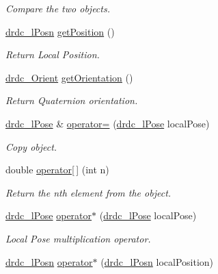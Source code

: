 \begin{CompactItemize}
\begin{CompactList}\small\item\em Compare the two objects. \item\end{CompactList}\item 
\hyperlink{classdrdc__lPosn}{drdc\_\-lPosn} \hyperlink{classdrdc__lPose_9ca79a1aa842f3187d25d783ada66f2a}{getPosition} ()
\begin{CompactList}\small\item\em Return Local Position. \item\end{CompactList}\item 
\hyperlink{classdrdc__Orient}{drdc\_\-Orient} \hyperlink{classdrdc__lPose_0f3c4aacd51b0f1f41de86bd90baaa7d}{getOrientation} ()
\begin{CompactList}\small\item\em Return Quaternion orientation. \item\end{CompactList}\item 
\hyperlink{classdrdc__lPose}{drdc\_\-lPose} \& \hyperlink{classdrdc__lPose_61ef881f54c7b30e4a2bc2dda04c81cc}{operator=} (\hyperlink{classdrdc__lPose}{drdc\_\-lPose} localPose)
\begin{CompactList}\small\item\em Copy object. \item\end{CompactList}\item 
double \hyperlink{classdrdc__lPose_182fbae4d3cd0ea39f5589c3a3563849}{operator\mbox{[}$\,$\mbox{]}} (int n)
\begin{CompactList}\small\item\em Return the nth element from the object. \item\end{CompactList}\item 
\hyperlink{classdrdc__lPose}{drdc\_\-lPose} \hyperlink{classdrdc__lPose_23e21ccf8e16055a40ed4afc66b0f093}{operator$\ast$} (\hyperlink{classdrdc__lPose}{drdc\_\-lPose} localPose)
\begin{CompactList}\small\item\em Local Pose multiplication operator. \item\end{CompactList}\item 
\hyperlink{classdrdc__lPosn}{drdc\_\-lPosn} \hyperlink{classdrdc__lPose_6e809b6b9175171c651d4435783d1527}{operator$\ast$} (\hyperlink{classdrdc__lPosn}{drdc\_\-lPosn} localPosition)

\end{CompactItemize}

